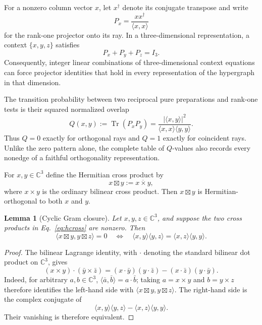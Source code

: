 \documentclass[twocolumn,aps,pra,floatfix,amsmath,amssymb,longbibliography]{revtex4-2}
\newtheorem{lemma}[theorem]{Lemma}
\theoremstyle{definition}
\theoremstyle{remark}
\newcommand{\C}{\mathbb C}
\begin{document}
For a nonzero column vector $x$, let $x^\dagger$ denote its conjugate
transpose and write
\begin{equation}
 P_x=\frac{xx^\dagger}{\langle x,x\rangle}
 \label{eq:projector}
\end{equation}
for the rank-one projector onto its ray.  In a three-dimensional
representation, a context $\{x,y,z\}$ satisfies
\begin{equation}
 P_x+P_y+P_z=I_3.
 \label{eq:context-sum}
\end{equation}
Consequently, integer linear combinations of three-dimensional context
equations can force projector identities that hold in every representation
of the hypergraph in that dimension.

The transition probability between two reciprocal pure preparations and
rank-one tests is their squared normalized overlap
\begin{equation}
 Q(x,y):=\operatorname{Tr}(P_xP_y)
 =\frac{|\langle x,y\rangle|^2}
 {\langle x,x\rangle\langle y,y\rangle}.
 \label{eq:Q}
\end{equation}
Thus $Q=0$ exactly for orthogonal rays and $Q=1$ exactly for coincident
rays.  Unlike the zero pattern alone, the complete table of $Q$-values also
records every nonedge of a faithful orthogonality representation.

For $x,y\in\C^3$ define the Hermitian cross product by
\begin{equation}
 x\boxtimes y:=\overline{x\times y},
 \label{eq:hcross}
\end{equation}
where $x\times y$ is the ordinary bilinear cross product.  Then
$x\boxtimes y$ is Hermitian-orthogonal to both $x$ and $y$.

\begin{lemma}[Cyclic Gram closure]
\label{lem:gram-closure}
Let $x,y,z\in\C^3$, and suppose the two cross products in
Eq.~\eqref{eq:hcross} are nonzero.  Then
\begin{equation}
 \langle x\boxtimes y,y\boxtimes z\rangle=0
 \quad\Longleftrightarrow\quad
 \langle x,y\rangle\langle y,z\rangle
 =\langle x,z\rangle\langle y,y\rangle.
 \label{eq:gram-closure}
\end{equation}
\end{lemma}

\begin{proof}
The bilinear Lagrange identity, with $\mathbin{\cdot}$ denoting the standard
bilinear dot product on $\C^3$, gives
\[
 (x\times y)\mathbin{\cdot}(\bar y\times\bar z)
 =(x\mathbin{\cdot}\bar y)(y\mathbin{\cdot}\bar z)
 -(x\mathbin{\cdot}\bar z)(y\mathbin{\cdot}\bar y).
\]
Indeed, for arbitrary $a,b\in\C^3$,
$\langle\bar a,\bar b\rangle=a\mathbin{\cdot}\bar b$; taking
$a=x\times y$ and $b=y\times z$ therefore identifies the left-hand side
with $\langle x\boxtimes y,y\boxtimes z\rangle$.  The right-hand side
is the complex conjugate of
\[
 \langle x,y\rangle\langle y,z\rangle
 -\langle x,z\rangle\langle y,y\rangle.
\]
Their vanishing is therefore equivalent.
\end{proof}
\end{document}
